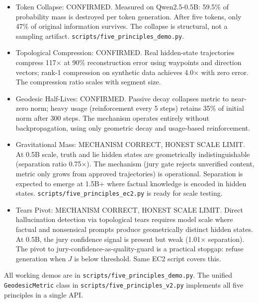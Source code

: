 \documentclass[11pt]{article}
\begin{document}
\begin{itemize}[nosep]
\item Token Collapse: CONFIRMED. Measured on Qwen2.5-0.5B: 59.5\%
      of probability mass is destroyed per token generation. After five tokens,
      only 47\% of original information survives. The collapse is structural,
      not a sampling artifact. \texttt{scripts/five\_principles\_demo.py}.
\item Topological Compression: CONFIRMED. Real hidden-state
      trajectories compress 117$\times$ at 90\% reconstruction error using
      waypoints and direction vectors; rank-1 compression on synthetic
      data achieves 4.0$\times$ with zero error. The compression ratio scales
      with segment size.
\item Geodesic Half-Lives: CONFIRMED. Passive decay collapses
      metric to near-zero norm; heavy usage (reinforcement every 5 steps)
      retains 35\% of initial norm after 300 steps. The mechanism
      operates entirely without backpropagation, using only geometric
      decay and usage-based reinforcement.
\item Gravitational Mass: MECHANISM CORRECT, HONEST SCALE LIMIT.
      At 0.5B scale, truth and lie hidden states are geometrically
      indistinguishable (separation ratio 0.75$\times$). The mechanism
      (jury gate rejects unverified content, metric only grows from
      approved trajectories) is operational. Separation is expected to
      emerge at 1.5B+ where factual knowledge is encoded in hidden states.
      \texttt{scripts/five\_principles\_ec2.py} is ready for scale testing.
\item Tears Pivot: MECHANISM CORRECT, HONEST SCALE LIMIT.
      Direct hallucination detection via topological tears requires
      model scale where factual and nonsensical prompts produce
      geometrically distinct hidden states. At 0.5B, the jury confidence
      signal is present but weak (1.01$\times$ separation). The pivot
      to jury-confidence-as-quality-guard is a practical stopgap: refuse
      generation when $J$ is below threshold. Same EC2 script covers this.
\end{itemize}

All working demos are in \texttt{scripts/five\_principles\_demo.py}.
The unified \texttt{GeodesicMetric} class in \texttt{scripts/five\_principles\_v2.py}
implements all five principles in a single API.
\end{document}
